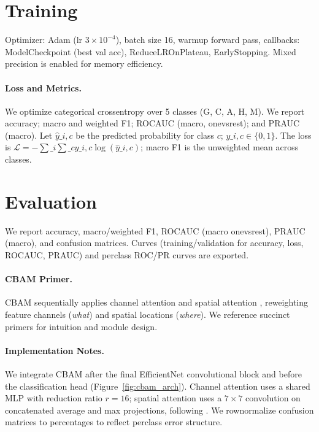 \section{Training}
Optimizer: Adam (lr $3\times10^{-4}$), batch size 16, warm\textendash up forward pass, callbacks: ModelCheckpoint (best val acc), ReduceLROnPlateau, EarlyStopping. Mixed precision is enabled for memory efficiency.

\paragraph{Loss and Metrics.} We optimize categorical cross\textendash entropy over 5 classes (G, C, A, H, M). We report accuracy; macro and weighted F1; ROC\textendash AUC (macro, one\textendash vs\textendash rest); and PR\textendash AUC (macro). Let $\hat{y}\_{i,c}$ be the predicted probability for class $c$; $y\_{i,c}\in\{0,1\}$. The loss is $\mathcal{L}= -\sum\_{i}\sum\_{c} y\_{i,c}\log(\hat{y}\_{i,c})$; macro F1 is the unweighted mean across classes.

\section{Evaluation}
We report accuracy, macro/weighted F1, ROC\textendash AUC (macro one\textendash vs\textendash rest), PR\textendash AUC (macro), and confusion matrices. Curves (training/validation for accuracy, loss, ROC\textendash AUC, PR\textendash AUC) and per\textendash class ROC/PR curves are exported.

\paragraph{CBAM Primer.} CBAM sequentially applies channel attention and spatial attention \cite{woo2018cbam}, reweighting feature channels (\emph{what}) and spatial locations (\emph{where}). We reference succinct primers \cite{cbamMedium,cbamDO} for intuition and module design.

\paragraph{Implementation Notes.} We integrate CBAM after the final EfficientNet convolutional block and before the classification head (Figure~\ref{fig:cbam_arch}). Channel attention uses a shared MLP with reduction ratio $r=16$; spatial attention uses a $7\times7$ convolution on concatenated average and max projections, following \cite{woo2018cbam,cbamDO}. We row\textendash normalize confusion matrices to percentages to reflect per\textendash class error structure.

